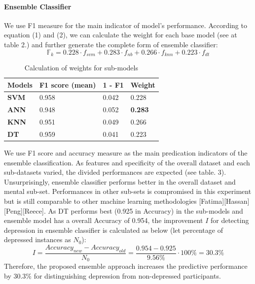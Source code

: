 \documentclass[runningheads]{llncs}
\begin{document}
\paragraph{Ensemble Classifier}
%
We use F1 measure for the main indicator of model's performance. According to equation (1) and (2), we can calculate the weight for each base model (see at table 2.) and further generate the complete form of ensemble classifier:
\begin{equation}
\mathbb{F}_{k} = 0.228 \cdot f_{svm} + 0.283 \cdot f_{nb} + 0.266 \cdot f_{knn} + 0.223 \cdot f_{dt}
\end{equation}
\begin{table}[h]
\begin{tabular}{|C{3cm}|C{3cm}|C{3cm}|C{3cm}|}
\hline
{} 
{\color[HTML]{333333} \textbf{Models}} & {\color[HTML]{333333} \textbf{F1 score (mean)}} & {\color[HTML]{333333} \textbf{1 - F1}} & {\color[HTML]{333333} \textbf{Weight}} \\ \hline
{} 
\textbf{SVM}& 0.958  & 0.042  & 0.228 \\ \hline
{} 
\textbf{ANN} & 0.948  & 0.052   & \textbf{0.283}    \\ \hline
{} 
\textbf{KNN} & 0.951   & 0.049  & 0.266 \\ \hline
{} 
\textbf{DT}  & 0.959  & 0.041  & 0.223  \\ \hline
\end{tabular}
\caption{Calculation of weights for sub-models}
\label{weight}
\end{table}
%
%

We use F1 score and accuracy measure as the main predication indicators of the ensemble classification. As features and specificity of the overall dataset and each sub-datasets varied, the divided performances are expected (see table. 3). Unsurprisingly, ensemble classifier performs better in the overall dataset and mental sub-set. Performances in other sub-sets is compromised in this experiment but is still comparable to other machine learning methodologies [Fatima][Hassan][Peng][Reece]. As DT performs best (0.925 in Accuracy) in the sub-models and ensemble model has a overall Accuracy of 0.954, the improvement $I$ for detecting depression in ensemble classifier is calculated as below (let percentage of depressed instances as $N_{0}$):\\
\begin{equation}\label{reio}
	 I = \frac{Accuracy_{new} - Accuracy_{old}}{N_{0}} = \frac{0.954 - 0.925}{9.56\%} \cdot 100\% = 30.3\%
\end{equation}
Therefore, the proposed ensemble approach increases the predictive performance by 30.3\% for distinguishing depression from non-depressed participants.
\end{document}
